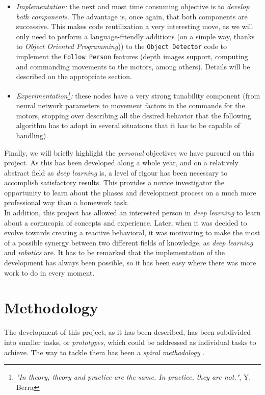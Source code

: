 \begin{itemize}
	\item \textit{Implementation:} the next and most time consuming objective is to \textit{develop both components}. The advantage is, once again, that both components are successive. This makes code reutilization a very interesting move, as we will only need to perform a language-friendly additions (on a simple way, thanks to \textit{Object Oriented Programming})) to the \texttt{Object Detector} code to implement the \texttt{Follow Person} features (depth images support, computing and commanding movements to the motors, among others). Details will be described on the appropriate section.
	
	\item \textit{Experimentation\footnote{\textit{"In theory, theory and practice are the same. In practice, they are not."}, Y. Berra}:} these nodes have a very strong tunability component (from neural network parameters to movement factors in the commands for the motors, stopping over describing all the desired behavior that the following algorithm has to adopt in several situations that it has to be capable of handling).
	
\end{itemize}

Finally, we will briefly highlight the \textit{personal} objectives we have pursued on this project. As this has been developed along a whole year, and on a relatively abstract field as \emph{deep learning} is, a level of rigour has been necessary to accomplish satisfactory results. This provides a novice investigator the opportunity to learn about the phases and development process on a much more professional way than a homework task. \\

In addition, this project has allowed an interested person in \emph{deep learning} to learn about a cornucopia of concepts and experience. Later, when it was decided to evolve towards creating a reactive behavioral, it was motivating to make the most of a possible synergy between two different fields of knowledge, as \emph{deep learning} and \emph{robotics} are. It has to be remarked that the implementation of the development has always been possible, so it has been easy where there was more work to do in every moment.

\section{Methodology}
The development of this project, as it has been described, has been subdivided into smaller tasks, or \emph{prototypes}, which could be addressed as individual tasks to achieve. The way to tackle them has been a \textit{spiral methodology} \cite{boehm-spiral}.\\

